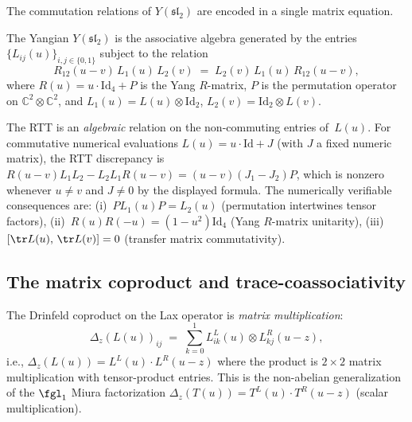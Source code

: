The commutation relations of $Y(\mathfrak{sl}_2)$ are encoded in
a single matrix equation.

\begin{proposition}
\label{prop:rtt}
The Yangian $Y(\mathfrak{sl}_2)$ is the associative algebra generated
by the entries $\{L_{ij}(u)\}_{i,j \in \{0,1\}}$ subject to the relation
\begin{equation}\label{eq:rtt}
 R_{12}(u - v)\, L_1(u)\, L_2(v)
 \;=\; L_2(v)\, L_1(u)\, R_{12}(u - v),
\end{equation}
where $R(u) = u \cdot \mathrm{Id}_4 + P$ is the Yang $R$-matrix,
$P$ is the permutation operator on $\mathbb{C}^2 \otimes \mathbb{C}^2$,
and $L_1(u) = L(u) \otimes \mathrm{Id}_2$,
$L_2(v) = \mathrm{Id}_2 \otimes L(v)$.
\end{proposition}

The RTT is an \emph{algebraic} relation on the non-commuting entries
of~$L(u)$.
For commutative numerical evaluations $L(u) = u \cdot \mathrm{Id} + J$
(with $J$ a fixed numeric matrix), the RTT discrepancy is
$R(u{-}v) L_1 L_2 - L_2 L_1 R(u{-}v) = (u{-}v)(J_1 - J_2) P$,
which is nonzero whenever $u \neq v$ and $J \neq 0$
by the displayed formula.
The numerically verifiable consequences are:
(i)~$P L_1(u) P = L_2(u)$ (permutation intertwines tensor factors),
(ii)~$R(u)R(-u) = (1 - u^2)\mathrm{Id}_4$ (Yang $R$-matrix unitarity),
(iii)~$[\tr L(u),\, \tr L(v)] = 0$ (transfer matrix commutativity).

\subsection{The matrix coproduct and trace-coassociativity}
\label{subsec:matrix-coproduct}

\begin{proposition}
\label{prop:matrix-lax-coproduct}
The Drinfeld coproduct on the Lax operator is \emph{matrix multiplication}:
\begin{equation}\label{eq:matrix-coproduct}
 \Delta_z(L(u))_{ij}
 \;=\; \sum_{k=0}^{1} L^L_{ik}(u) \otimes L^R_{kj}(u - z),
\end{equation}
i.e., $\Delta_z(L(u)) = L^L(u) \cdot L^R(u - z)$ where the product is
$2 \times 2$ matrix multiplication with tensor-product entries.
This is the non-abelian generalization of the $\fgl_1$ Miura factorization
$\Delta_z(T(u)) = T^L(u) \cdot T^R(u - z)$ (scalar multiplication).
\end{proposition}

